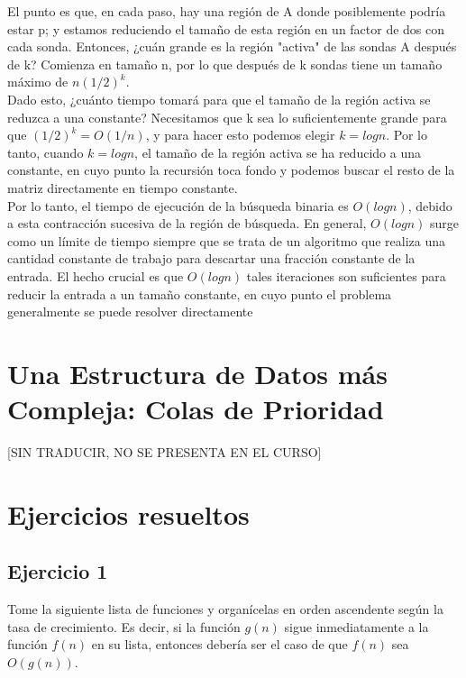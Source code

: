 \documentclass[a4paper, 12pt]{book}
\begin{document}
El punto es que, en cada paso, hay una región de A donde posiblemente podría estar p; y
estamos reduciendo el tamaño de esta región en un factor de dos con cada sonda. Entonces, ¿cuán grande es la región "activa" de las sondas A después de k? Comienza en tamaño n, por lo que después de k sondas tiene un tamaño máximo de $n(1/2)^k$.\\

Dado esto, ¿cuánto tiempo tomará para que el tamaño de la región activa se reduzca a una
constante? Necesitamos que k sea lo suficientemente grande para que $(1/2)^k=O(1/n)$, y para hacer
esto podemos elegir $k=log n$. Por lo tanto, cuando $k=log n$, el tamaño de la región activa se ha
reducido a una constante, en cuyo punto la recursión toca fondo y podemos buscar el resto de la matriz
directamente en tiempo constante.\\

Por lo tanto, el tiempo de ejecución de la búsqueda binaria es $O(log n)$, debido a esta
contracción sucesiva de la región de búsqueda. En general, $O(log n)$ surge como un límite de tiempo
siempre que se trata de un algoritmo que realiza una cantidad constante de trabajo para descartar una
fracción constante de la entrada. El hecho crucial es que $O(log n)$ tales iteraciones son suficientes para
reducir la entrada a un tamaño constante, en cuyo punto el problema generalmente se puede resolver
directamente\\

\section{Una Estructura de Datos más Compleja: Colas de Prioridad}

[SIN TRADUCIR, NO SE PRESENTA EN EL CURSO]

\section{Ejercicios resueltos}

\subsection*{Ejercicio 1} 

Tome la siguiente lista de funciones y organícelas en orden ascendente según la tasa de crecimiento. Es decir, si la función $g(n)$ sigue inmediatamente a la función $f(n)$ en su lista, entonces debería ser el caso de que $f(n)$ sea $O(g(n))$.\\
\end{document}
